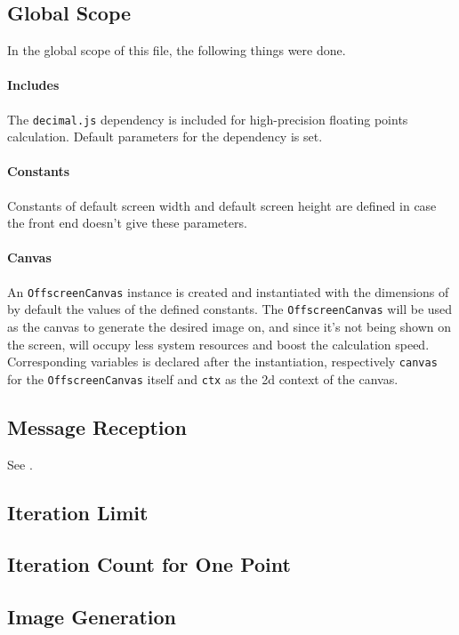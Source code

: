\subsection{Global Scope}

In the global scope of this file, the following things were done.

\paragraph{Includes} The \texttt{decimal.js} dependency is included for high-precision floating points calculation. Default parameters for the dependency is set.

\paragraph{Constants} Constants of default screen width and default screen height are defined in case the front end doesn't give these parameters.

\paragraph{Canvas} An \texttt{OffscreenCanvas} instance is created and instantiated with the dimensions of by default the values of the defined constants. The \texttt{OffscreenCanvas} will be used as the canvas to generate the desired image on, and since it's not being shown on the screen, will occupy less system resources and boost the calculation speed. Corresponding variables is declared after the instantiation, respectively \texttt{canvas} for the \texttt{OffscreenCanvas} itself and \texttt{ctx} as the 2d context of the canvas.

\subsection{Message Reception}

See .

\subsection{Iteration Limit}

\subsection{Iteration Count for One Point}

\subsection{Image Generation}


